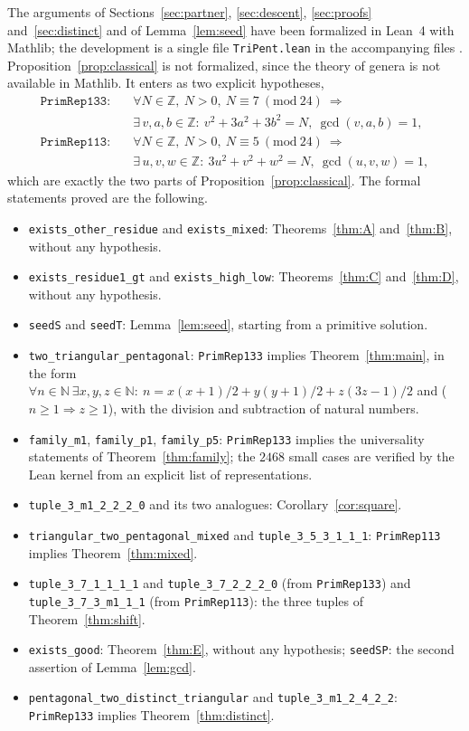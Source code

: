 \documentclass[11pt]{amsart}
\theoremstyle{definition}
\theoremstyle{remark}
\newcommand{\N}{\mathbb{N}}
\newcommand{\Z}{\mathbb{Z}}
\begin{document}
The arguments of Sections~\ref{sec:partner}, \ref{sec:descent}, \ref{sec:proofs} and~\ref{sec:distinct} and of Lemma~\ref{lem:seed}
have been formalized in Lean~4 with Mathlib; the development is a single file \texttt{TriPent.lean} in the accompanying files \cite{code}.
Proposition~\ref{prop:classical} is not formalized, since the theory of genera is not available in Mathlib.
It enters as two explicit hypotheses,
\begin{align*}
\texttt{PrimRep133}:\quad &\forall N\in\Z,\ N>0,\ N\equiv 7 \ (\mathrm{mod}\ 24)\ \Longrightarrow\\
&\exists\, v,a,b\in\Z:\ v^2+3a^2+3b^2=N,\ \gcd(v,a,b)=1,\\
\texttt{PrimRep113}:\quad &\forall N\in\Z,\ N>0,\ N\equiv 5 \ (\mathrm{mod}\ 24)\ \Longrightarrow\\
&\exists\, u,v,w\in\Z:\ 3u^2+v^2+w^2=N,\ \gcd(u,v,w)=1,
\end{align*}
which are exactly the two parts of Proposition~\ref{prop:classical}. The formal statements proved are the following.
\begin{itemize}
\item \texttt{exists\_other\_residue} and \texttt{exists\_mixed}: Theorems~\ref{thm:A} and~\ref{thm:B}, without any hypothesis.
\item \texttt{exists\_residue1\_gt} and \texttt{exists\_high\_low}: Theorems~\ref{thm:C} and~\ref{thm:D}, without any hypothesis.
\item \texttt{seedS} and \texttt{seedT}: Lemma~\ref{lem:seed}, starting from a primitive solution.
\item \texttt{two\_triangular\_pentagonal}: \texttt{PrimRep133} implies Theorem~\ref{thm:main}, in the form
$\forall n\in\N\ \exists x,y,z\in\N:\ n=x(x+1)/2+y(y+1)/2+z(3z-1)/2$ and ($n\ge 1\Rightarrow z\ge 1$), with the division and subtraction of natural numbers.
\item \texttt{family\_m1}, \texttt{family\_p1}, \texttt{family\_p5}: \texttt{PrimRep133} implies the universality statements of Theorem~\ref{thm:family};
the $2468$ small cases are verified by the Lean kernel from an explicit list of representations.
\item \texttt{tuple\_3\_m1\_2\_2\_2\_0} and its two analogues: Corollary~\ref{cor:square}.
\item \texttt{triangular\_two\_pentagonal\_mixed} and \texttt{tuple\_3\_5\_3\_1\_1\_1}: \texttt{PrimRep113} implies Theorem~\ref{thm:mixed}.
\item \texttt{tuple\_3\_7\_1\_1\_1\_1} and \texttt{tuple\_3\_7\_2\_2\_2\_0} (from \texttt{PrimRep133}) and \texttt{tuple\_3\_7\_3\_m1\_1\_1} (from \texttt{PrimRep113}):
the three tuples of Theorem~\ref{thm:shift}.
\item \texttt{exists\_good}: Theorem~\ref{thm:E}, without any hypothesis; \texttt{seedSP}: the second assertion of Lemma~\ref{lem:gcd}.
\item \texttt{pentagonal\_two\_distinct\_triangular} and \texttt{tuple\_3\_m1\_2\_4\_2\_2}: \texttt{PrimRep133} implies Theorem~\ref{thm:distinct}.
\end{itemize}
\end{document}
